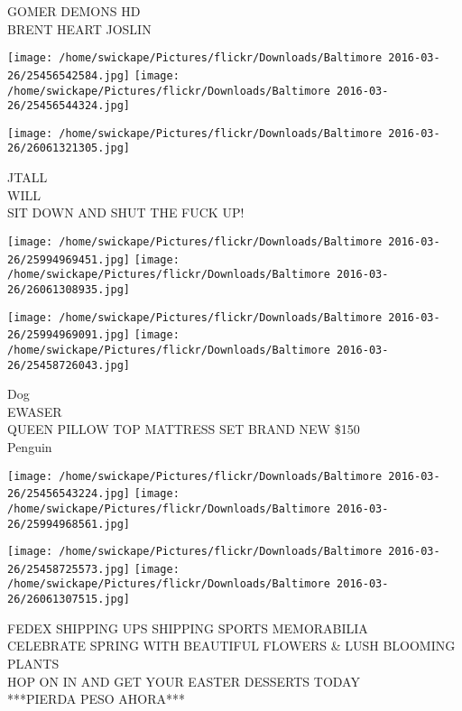 \documentclass[10pt,letterpaper]{article}
\begin{document}
GOMER DEMONS HD\\
BRENT HEART JOSLIN
\pagebreak

\texttt{[image: /home/swickape/Pictures/flickr/Downloads/Baltimore 2016-03-26/25456542584.jpg]}
\texttt{[image: /home/swickape/Pictures/flickr/Downloads/Baltimore 2016-03-26/25456544324.jpg]}

\vspace{0.25in}
\texttt{[image: /home/swickape/Pictures/flickr/Downloads/Baltimore 2016-03-26/26061321305.jpg]}

JTALL\\
WILL\\
SIT DOWN AND SHUT THE FUCK UP!
\pagebreak

\texttt{[image: /home/swickape/Pictures/flickr/Downloads/Baltimore 2016-03-26/25994969451.jpg]}
\texttt{[image: /home/swickape/Pictures/flickr/Downloads/Baltimore 2016-03-26/26061308935.jpg]}

\texttt{[image: /home/swickape/Pictures/flickr/Downloads/Baltimore 2016-03-26/25994969091.jpg]}
\texttt{[image: /home/swickape/Pictures/flickr/Downloads/Baltimore 2016-03-26/25458726043.jpg]}

Dog\\
EWASER\\
QUEEN PILLOW TOP MATTRESS SET BRAND NEW \$150\\
Penguin
\pagebreak

\texttt{[image: /home/swickape/Pictures/flickr/Downloads/Baltimore 2016-03-26/25456543224.jpg]}
\texttt{[image: /home/swickape/Pictures/flickr/Downloads/Baltimore 2016-03-26/25994968561.jpg]}

\texttt{[image: /home/swickape/Pictures/flickr/Downloads/Baltimore 2016-03-26/25458725573.jpg]}
\texttt{[image: /home/swickape/Pictures/flickr/Downloads/Baltimore 2016-03-26/26061307515.jpg]}

FEDEX SHIPPING UPS SHIPPING SPORTS MEMORABILIA\\
CELEBRATE SPRING WITH BEAUTIFUL FLOWERS \& LUSH BLOOMING PLANTS\\
HOP ON IN AND GET YOUR EASTER DESSERTS TODAY\\
***PIERDA PESO AHORA***
\pagebreak
\end{document}

